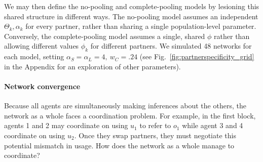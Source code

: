 We may then define the no-pooling and complete-pooling models by lesioning this shared structure in different ways. 
The no-pooling model assumes an independent $\Theta_k, \alpha_k$ for every partner, rather than sharing a single population-level parameter.
Conversely, the complete-pooling model assumes a single, shared $\phi$ rather than allowing different values $\phi_k$ for different partners.
We simulated 48 networks for each model, setting $\alpha_S = \alpha_L = 4,~w_C = .24$ (see Fig.~\ref{fig:partnerspecificity_grid} in the Appendix for an exploration of other parameters).


\paragraph{Network convergence}

Because all agents are simultaneously making inferences about the others, the network as a whole faces a coordination problem.
For example, in the first block, agents 1 and 2 may coordinate on using $u_1$ to refer to $o_1$ while agent 3 and 4 coordinate on using $u_2$. 
Once they swap partners, they must negotiate this potential mismatch in usage. 
How does the network as a whole manage to coordinate?

